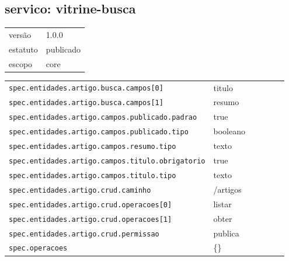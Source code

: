 \subsection*{servico: vitrine-busca}
\begin{tabular}{@{}ll@{}}
versão & 1.0.0 \\
estatuto & publicado \\
escopo & core \\
\end{tabular}

\begin{tabular}{@{}p{0.35\linewidth}p{0.6\linewidth}@{}}
\texttt{spec.entidades.artigo.busca.campos[0]} & titulo \\
\texttt{spec.entidades.artigo.busca.campos[1]} & resumo \\
\texttt{spec.entidades.artigo.campos.publicado.padrao} & true \\
\texttt{spec.entidades.artigo.campos.publicado.tipo} & booleano \\
\texttt{spec.entidades.artigo.campos.resumo.tipo} & texto \\
\texttt{spec.entidades.artigo.campos.titulo.obrigatorio} & true \\
\texttt{spec.entidades.artigo.campos.titulo.tipo} & texto \\
\texttt{spec.entidades.artigo.crud.caminho} & /artigos \\
\texttt{spec.entidades.artigo.crud.operacoes[0]} & listar \\
\texttt{spec.entidades.artigo.crud.operacoes[1]} & obter \\
\texttt{spec.entidades.artigo.crud.permissao} & publica \\
\texttt{spec.operacoes} & \{\} \\
\end{tabular}
